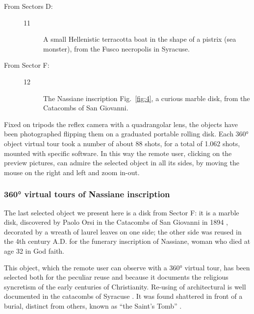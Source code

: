 \documentclass[amsthm,ebook]{saparticle}
\begin{document}
\begin{description}
\item[From Sectors D:]

\begin{description}
\item[11] A small Hellenistic terracotta boat in the shape of a pistrix (sea monster), from the Fusco necropolis in Syracuse. 

\end{description}

\item[From Sector F:]

\begin{description}
\item[12] The Nassiane inscription Fig.~\ref{fig:4}, a curious marble disk, from the Catacombs of San Giovanni.
\end{description}


\end{description}

Fixed on tripods the reflex camera with a quadrangolar lens, the objects have been photographed flipping them on a
graduated portable rolling disk. Each 360° object virtual tour took a number of about 88 shots, for a total of 1.062
shots, mounted with specific software. In this way the remote user, clicking on the preview pictures, can admire the
selected object in all its sides, by moving the mouse on the right and left and zoom in-out.




\subsubsection{360° virtual tours of Nassiane inscription}


The last selected object we present here is a disk from Sector F: it is a marble disk, discovered by Paolo Orsi in the
Catacombs of San Giovanni in 1894 \citep[509-510]{Orsi1895}, decorated by a wreath of laurel leaves on one side; the other
side was reused in the 4th century A.D. for the funerary inscription of Nassiane, woman who died at age 32 in God
faith. 

This object, which the remote user can observe with a 360° virtual tour, has been selected both for the peculiar reuse
and because it documents the religious syncretism of the early centuries of Christianity. Re-using of architectural is
well documented in the catacombs of Syracuse \citep{Sgarlata2013}. It was found shattered in front of a burial, distinct
from others, known as ``the Saint's Tomb'' \citep[40-44]{Sgarlata2004}. 
\end{document}
